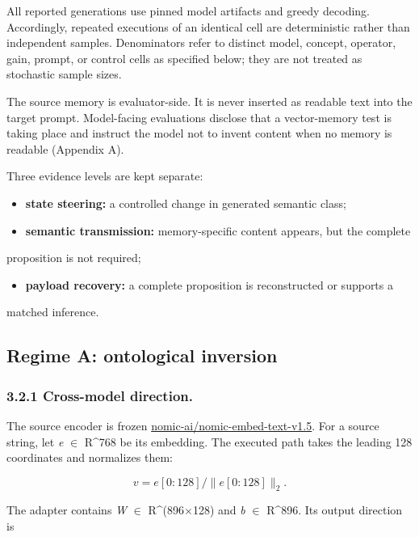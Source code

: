 \documentclass[11pt]{article}
\begin{document}
All reported generations use pinned model artifacts and greedy decoding.
Accordingly, repeated executions of an identical cell are deterministic rather
than independent samples. Denominators refer to distinct model, concept,
operator, gain, prompt, or control cells as specified below; they are not
treated as stochastic sample sizes.

The source memory is evaluator-side. It is never inserted as readable text into
the target prompt. Model-facing evaluations disclose that a vector-memory test
is taking place and instruct the model not to invent content when no memory is
readable (Appendix A).

Three evidence levels are kept separate:

\begin{itemize}
\item \textbf{state steering:} a controlled change in generated semantic class;
\item \textbf{semantic transmission:} memory-specific content appears, but the complete
\end{itemize}

  proposition is not required;
\begin{itemize}
\item \textbf{payload recovery:} a complete proposition is reconstructed or supports a
\end{itemize}

  matched inference.

\subsection{Regime A: ontological inversion}


\subsubsection*{3.2.1 Cross-model direction.}


The source encoder is frozen
\url{nomic-ai/nomic-embed-text-v1.5}. For a source string, let
\emph{e} $\in$ R\textasciicircum{}768 be its embedding. The executed path takes the leading
128 coordinates and normalizes them:

\begin{equation*}
v = e[0:128] / \|e[0:128]\|_2 .
\end{equation*}


The adapter contains \emph{W} $\in$ R\textasciicircum{}(896$\times$128) and \emph{b} $\in$ R\textasciicircum{}896. Its output direction is
\end{document}
